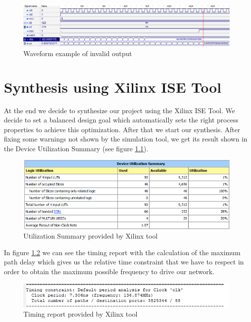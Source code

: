 \documentclass[12pt,a4paper]{report}
\begin{document}
\begin{figure}[!h]
\centering
\includegraphics[width=\textwidth]{img/test-valid.png}
\caption{Waveform example of invalid output\label{fig:invalid}}
\end{figure}


\chapter{Synthesis using Xilinx ISE Tool}
At the end we decide to synthesize our project using the Xilinx ISE Tool. We decide to set a balanced design goal which automatically sets the right process properties to achieve this optimization. After that we start our synthesis.
After fixing some warnings not shown by the simulation tool, we get its result shown in the Device Utilization Summary (see figure \ref{fig:dev_utilization_summ}). 

\begin{figure}[!h]
	\centering
	\includegraphics[scale=0.9]{img/utilizationSummary.png}
	\caption{Utilization Summary provided by Xilinx tool\label{fig:dev_utilization_summ}}
\end{figure}


In figure \ref{fig:timing_report} we can see the timing report with the calculation of the maximum path delay which gives us the relative time constraint that we have to respect in order to obtain the maximum possible frequency to drive our network.

\begin{figure}[!h]
	\centering
	\includegraphics[scale=0.9]{img/timingReport.png}
	\caption{Timing report provided by Xilinx tool\label{fig:timing_report}}
\end{figure}
\end{document}
